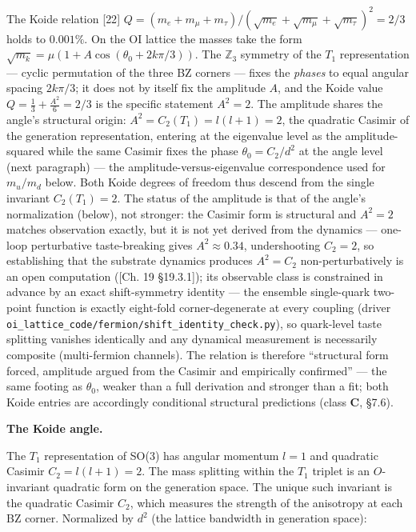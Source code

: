 \documentclass[
]{article}
\begin{document}
The Koide relation {[}22{]}
\(Q = (m_e + m_\mu + m_\tau)/(\sqrt{m_e} + \sqrt{m_\mu} + \sqrt{m_\tau})^2 = 2/3\)
holds to \(0.001\%\). On the OI lattice the masses take the form
\(\sqrt{m_k} = \mu(1 + A\cos(\theta_0 + 2k\pi/3))\). The
\(\mathbb{Z}_3\) symmetry of the \(T_1\) representation --- cyclic
permutation of the three BZ corners --- fixes the \emph{phases} to equal
angular spacing \(2k\pi/3\); it does not by itself fix the amplitude
\(A\), and the Koide value \(Q = \tfrac13 + \tfrac{A^2}{6} = 2/3\) is
the specific statement \(A^2 = 2\). The amplitude shares the angle's
structural origin: \(A^2 = C_2(T_1) = l(l+1) = 2\), the quadratic
Casimir of the generation representation, entering at the eigenvalue
level as the amplitude-squared while the same Casimir fixes the phase
\(\theta_0 = C_2/d^2\) at the angle level (next paragraph) --- the
amplitude-versus-eigenvalue correspondence used for \(m_u/m_d\) below.
Both Koide degrees of freedom thus descend from the single invariant
\(C_2(T_1) = 2\). The status of the amplitude is that of the angle's
normalization (below), not stronger: the Casimir form is structural and
\(A^2 = 2\) matches observation exactly, but it is not yet derived from
the dynamics --- one-loop perturbative taste-breaking gives
\(A^2 \approx 0.34\), undershooting \(C_2 = 2\), so establishing that
the substrate dynamics produces \(A^2 = C_2\) non-perturbatively is an
open computation ({[}Ch. 19 §19.3.1{]}); its observable class is
constrained in advance by an exact shift-symmetry identity --- the
ensemble single-quark two-point function is exactly eight-fold
corner-degenerate at every coupling (driver
\texttt{oi\_lattice\_code/fermion/shift\_identity\_check.py}), so
quark-level taste splitting vanishes identically and any dynamical
measurement is necessarily composite (multi-fermion channels). The
relation is therefore ``structural form forced, amplitude argued from
the Casimir and empirically confirmed'' --- the same footing as
\(\theta_0\), weaker than a full derivation and stronger than a fit;
both Koide entries are accordingly conditional structural predictions
(class \textbf{C}, §7.6).

\textbf{The Koide angle.}

The \(T_1\) representation of SO(3) has angular momentum \(l = 1\) and
quadratic Casimir \(C_2 = l(l+1) = 2\). The mass splitting within the
\(T_1\) triplet is an \(O\)-invariant quadratic form on the generation
space. The unique such invariant is the quadratic Casimir \(C_2\), which
measures the strength of the anisotropy at each BZ corner. Normalized by
\(d^2\) (the lattice bandwidth in generation space):
\end{document}
